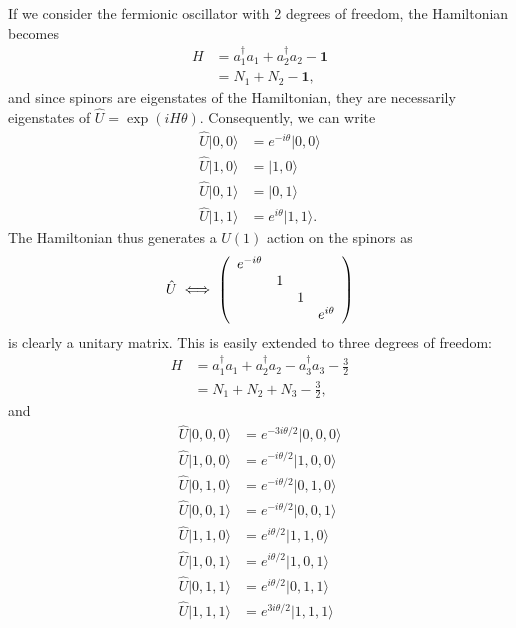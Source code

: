 \documentclass{../mathnotes}
\begin{document}
If we consider the fermionic oscillator with 2 degrees of freedom, the Hamiltonian becomes
\begin{align*}
    H&=a_1^\dagger a_1+a_2^\dagger a_2 -\mathbf{1}\\
    &=N_1+N_2-\mathbf{1},
\end{align*}
and since spinors are eigenstates of the Hamiltonian, they are necessarily eigenstates of $\hat U=\exp(iH\theta)$. Consequently,
we can write
\begin{align*}
    \hat U|0,0\rangle&=e^{-i\theta}|0,0\rangle\\
    \hat U|1,0\rangle&=|1,0\rangle\\
    \hat U|0,1\rangle&=|0,1\rangle\\
    \hat U|1,1\rangle&=e^{i\theta}|1,1\rangle.
\end{align*}
The Hamiltonian thus generates a $U(1)$ action on the spinors as
\begin{align*}
    \hat U \iff
    \left(
    \begin{array}[]{cccc}
        e^{-i\theta} &  &  & \\
         & 1 &  & \\
         &  & 1 & \\
         &  &  & e^{i\theta}
    \end{array}
    \right)
\end{align*}
is clearly a unitary matrix. This is easily extended to three degrees of freedom:
\begin{align*}
    H&=a_1^\dagger a_1+a_2^\dagger a_2 -a_3^\dagger a_3 -\frac{3}{2}\\
    &=N_1+N_2+N_3-\frac{3}{2},
\end{align*}
and
\begin{align*}
    \hat U|0,0,0\rangle&=e^{-3i\theta/2}|0,0,0\rangle\\
    \hat U|1,0,0\rangle&=e^{-i\theta/2}|1,0,0\rangle\\
    \hat U|0,1,0\rangle&=e^{-i\theta/2}|0,1,0\rangle\\
    \hat U|0,0,1\rangle&=e^{-i\theta/2}|0,0,1\rangle\\
    \hat U|1,1,0\rangle&=e^{i\theta/2}|1,1,0\rangle\\
    \hat U|1,0,1\rangle&=e^{i\theta/2}|1,0,1\rangle\\
    \hat U|0,1,1\rangle&=e^{i\theta/2}|0,1,1\rangle\\
    \hat U|1,1,1\rangle&=e^{3i\theta/2}|1,1,1\rangle\\
\end{align*}
\end{document}
